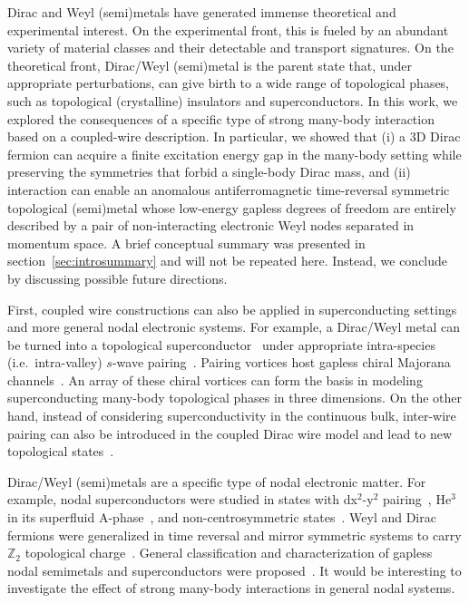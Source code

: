 Dirac and Weyl (semi)metals have generated immense theoretical and experimental interest. On the experimental front, this is fueled by an abundant variety of material classes and their detectable \ARPES and transport signatures. On the theoretical front, Dirac/Weyl (semi)metal is the parent state that, under appropriate perturbations, can give birth to a wide range of topological phases, such as topological (crystalline) insulators and superconductors. In this work, we explored the consequences of a specific type of strong many-body interaction based on a coupled-wire description. In particular, we showed that (i) a 3D Dirac fermion can acquire a finite excitation energy gap in the many-body setting while preserving the symmetries that forbid a single-body Dirac mass, and (ii) interaction can enable an anomalous antiferromagnetic time-reversal symmetric topological (semi)metal whose low-energy gapless degrees of freedom are entirely described by a pair of non-interacting electronic Weyl nodes separated in momentum space. A brief conceptual summary was presented in section~\ref{sec:introsummary} and will not be repeated here. Instead, we conclude by discussing possible future directions.

First, coupled wire constructions can also be applied in superconducting settings and more general nodal electronic systems. For example, a Dirac/Weyl metal can be turned into a topological superconductor~\cite{SchnyderRyuFurusakiLudwig08,Kitaevtable08,QiHughesRaghuZhang09} under appropriate intra-species (i.e.~intra-valley) $s$-wave pairing~\cite{QiWittenZhang13}. Pairing vortices host gapless chiral Majorana channels~\cite{QiWittenZhang13,GuQi15,LopesTeoRyu17}. An array of these chiral vortices can form the basis in modeling superconducting many-body topological phases in three dimensions. On the other hand, instead of considering superconductivity in the continuous bulk, inter-wire pairing can also be introduced in the coupled Dirac wire model and lead to new topological states~\cite{ParkTeoGilbertappearsoon}.

Dirac/Weyl (semi)metals are a specific type of nodal electronic matter. For example, nodal superconductors were studied in states with dx$^2$-y$^2$ pairing~\cite{RyuHatsugaiPRL02}, He$^3$ in its superfluid A-phase~\cite{Volovik3HeA,Volovikbook}, and non-centrosymmetric states~\cite{SchnyderRyuFlat,BrydonSchnyderTimmFlat}. Weyl and Dirac fermions were generalized in time reversal and mirror symmetric systems to carry $\mathbb{Z}_2$ topological charge~\cite{morimotoFurusakiPRB14}. General classification and characterization of gapless nodal semimetals and superconductors were proposed~\cite{Sato_Crystalline_PRB14,ZhaoWangPRL13,ZhaoWangPRB14,ChiuSchnyder14,matsuuraNJP13,Volovikbook,RMP,HoravaPRL05}. It would be interesting to investigate the effect of strong many-body interactions in general nodal systems.

